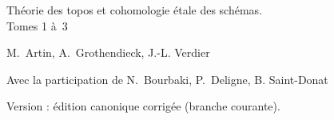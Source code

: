 \documentclass[12pt]{../fichiers-configuration-latex/amsbook}
\begin{document}
\begin{center}
{\Large Théorie des topos et cohomologie étale des schémas.\\
Tomes 1 à 3}\\
\end{center}

\vskip1cm
\begin{center}
M. Artin, A. Grothendieck, J.-L. Verdier
\end{center}

\vskip1cm
\begin{center}
Avec la participation de N. Bourbaki, P. Deligne, B. Saint-Donat
\end{center}

Version : édition canonique corrigée (branche courante).
\tableofcontents

\mainmatter

\def\danslelivre{1}

\def\thechapter{\Roman{chapter}}
\def\chaptername{Exposé}






\renewcommand*{\thechapter}{Vbis}

\setcounter{chapter}{5}
\def\thechapter{\Roman{chapter}}















\backmatter
\end{document}

